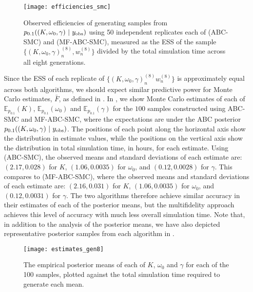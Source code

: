 \documentclass[review,demo]{siamonline190516}
\begin{document}
\begin{figure}
\centering
\texttt{[image: efficiencies\_smc]}
\caption{
Observed efficiencies of generating samples from $p_{0.1}((K, \omega_0, \gamma)~|~y_{\mathrm{obs}})$ using 50 independent replicates each of  (ABC-SMC) and  (MF-ABC-SMC), measured as the ESS of the sample $\{(K, \omega_0, \gamma)_n^{(8)}, w_n^{(8)}\}$ divided by the total simulation time across all eight generations.
}
\label{fig:efficiencies_smc}
\end{figure}

Since the ESS of each replicate of $\{ (K, \omega_0, \gamma)_n^{(8)} w_n^{(8)}  \}$ is approximately equal across both algorithms, we should expect similar predictive power for Monte Carlo estimates, $\bar F$, as defined in .
In , we show Monte Carlo estimates of each of $\mathbb E_{p_{0.1}}(K)$, $\mathbb E_{p_{0.1}}(\omega_0)$ and $\mathbb E_{p_{0.1}}(\gamma)$ for the $100$ samples constructed using ABC-SMC and MF-ABC-SMC, where the expectations are under the ABC posterior $p_{0.1}((K, \omega_0, \gamma)~|~y_{\mathrm{obs}})$.
The positions of each point along the horizontal axis show the distribution in estimate values, while the positions on the vertical axis show the distribution in total simulation time, in hours, for each estimate.
Using  (ABC-SMC), the observed means and standard deviations of each estimate are: 
$(2.17, 0.028)$ for $K$, $(1.06, 0.0035)$ for $\omega_0$, and $(0.12, 0.0028)$ for $\gamma$.
This compares to  (MF-ABC-SMC), where the observed means and standard deviations of each estimate are: 
$(2.16, 0.031)$ for $K$, $(1.06, 0.0035)$ for $\omega_0$, and $(0.12, 0.0031)$ for $\gamma$.
The two algorithms therefore achieve similar accuracy in their estimates of each of the posterior means, but the multifidelity approach achieves this level of accuracy with much less overall simulation time.
Note that, in addition to the analysis of the posterior means, we have also depicted representative posterior samples from each algorithm in .

\begin{figure*}
\centering
\texttt{[image: estimates\_gen8]}
\caption{
The empirical posterior means of each of $K$, $\omega_0$ and $\gamma$ for each of the 100 samples, plotted against the total simulation time required to generate each mean.
}
\label{fig:empirical_means}
\end{figure*}
\end{document}
